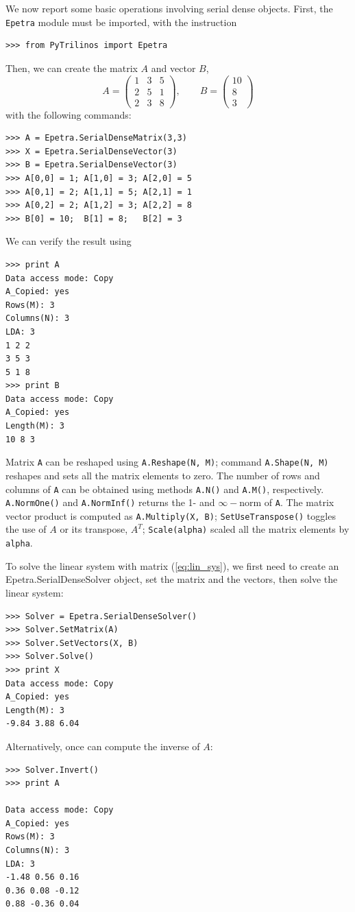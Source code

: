 \documentclass[10pt,relax]{SANDreport}
\begin{document}
We now report some basic operations involving serial dense objects. First, 
the {\tt Epetra} module must be imported, with the instruction
\begin{verbatim}
>>> from PyTrilinos import Epetra
\end{verbatim}
Then, we can create the matrix $A$ and vector $B$,
\[
A = 
\begin{pmatrix}
1 & 3 & 5 \\
2 & 5 & 1 \\
2 & 3 & 8
\end{pmatrix}
, \quad \quad
B = 
\begin{pmatrix}
10 \\
  8 \\
  3
\end{pmatrix}
\]
with the following commands:
\begin{verbatim}
>>> A = Epetra.SerialDenseMatrix(3,3)
>>> X = Epetra.SerialDenseVector(3)
>>> B = Epetra.SerialDenseVector(3)
>>> A[0,0] = 1; A[1,0] = 3; A[2,0] = 5
>>> A[0,1] = 2; A[1,1] = 5; A[2,1] = 1
>>> A[0,2] = 2; A[1,2] = 3; A[2,2] = 8
>>> B[0] = 10;  B[1] = 8;   B[2] = 3
\end{verbatim}
We can  verify the result using 
\begin{verbatim}
>>> print A
Data access mode: Copy
A_Copied: yes
Rows(M): 3
Columns(N): 3
LDA: 3
1 2 2 
3 5 3 
5 1 8 
>>> print B
Data access mode: Copy
A_Copied: yes
Length(M): 3
10 8 3 
\end{verbatim}
Matrix {\tt A} can be reshaped using \verb!A.Reshape(N, M)!; command
\verb!A.Shape(N, M)! reshapes and sets all the matrix elements to zero.  The
number of rows and columns of {\tt A} can be obtained using methods
\verb!A.N()! and \verb!A.M()!, respectively. \verb!A.NormOne()! and
\verb!A.NormInf()!  returns the 1- and $\infty-$norm of {\tt A}. The matrix
vector product is computed as \verb!A.Multiply(X, B)!;
\verb!SetUseTranspose()! toggles the use of $A$ or its transpose, $A^T$;
\verb!Scale(alpha)! scaled all the matrix elements by \verb!alpha!.

To solve the linear system with matrix (\ref{eq:lin_sys}), we first need to
create an Epetra.SerialDenseSolver object, set the matrix and the vectors,
  then solve the linear system:
\begin{verbatim}
>>> Solver = Epetra.SerialDenseSolver()
>>> Solver.SetMatrix(A)
>>> Solver.SetVectors(X, B)
>>> Solver.Solve()
>>> print X
Data access mode: Copy
A_Copied: yes
Length(M): 3
-9.84 3.88 6.04 
\end{verbatim}
Alternatively, once can compute the inverse of $A$:
\begin{verbatim}
>>> Solver.Invert()
>>> print A

Data access mode: Copy
A_Copied: yes
Rows(M): 3
Columns(N): 3
LDA: 3
-1.48 0.56 0.16 
0.36 0.08 -0.12 
0.88 -0.36 0.04 
\end{verbatim}
\end{document}
